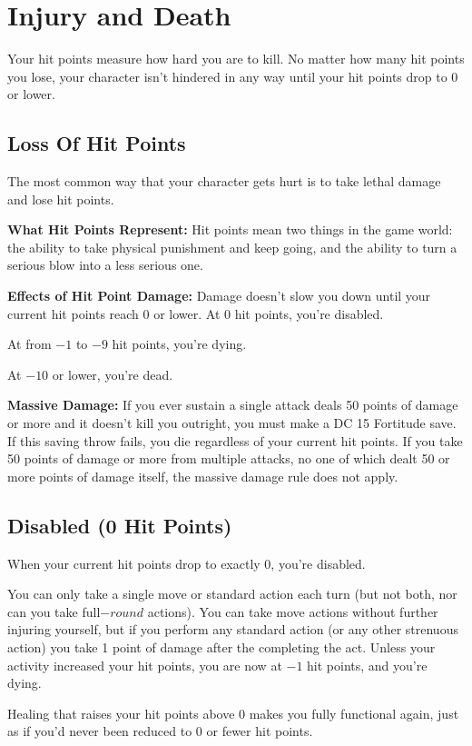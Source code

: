 \section{Injury and Death}
Your hit points measure how hard you are to kill. No matter how many hit points you lose, your character isn't hindered in any way until your hit points drop to 0 or lower.

\subsection{Loss Of Hit Points}
The most common way that your character gets hurt is to take lethal damage and lose hit points.

\textbf{What Hit Points Represent:} Hit points mean two things in the game world: the ability to take physical punishment and keep going, and the ability to turn a serious blow into a less serious one.

\textbf{Effects of Hit Point Damage:} Damage doesn't slow you down until your current hit points reach 0 or lower. At 0 hit points, you're disabled.

At from $-1$ to $-9$ hit points, you're dying.

At $-10$ or lower, you're dead.

\textbf{Massive Damage:} If you ever sustain a single attack deals 50 points of damage or more and it doesn't kill you outright, you must make a DC 15 Fortitude save. If this saving throw fails, you die regardless of your current hit points. If you take 50 points of damage or more from multiple attacks, no one of which dealt 50 or more points of damage itself, the massive damage rule does not apply.

\subsection{Disabled (0 Hit Points)}
When your current hit points drop to exactly 0, you're disabled.

You can only take a single move or standard action each turn (but not both, nor can you take full$-round$ actions). You can take move actions without further injuring yourself, but if you perform any standard action (or any other strenuous action) you take 1 point of damage after the completing the act. Unless your activity increased your hit points, you are now at $-1$ hit points, and you're dying.

Healing that raises your hit points above 0 makes you fully functional again, just as if you'd never been reduced to 0 or fewer hit points.

